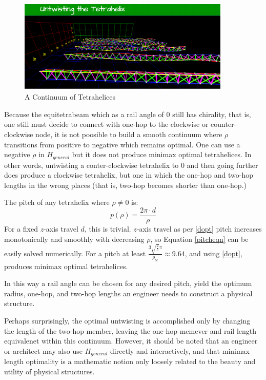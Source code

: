 \documentclass[11pt]{article}
\begin{document}
 \begin{figure}[H]
     \centering
     \includegraphics[width=0.9\textwidth]{figures/Continuum.png}
     \caption{A Continuum of Tetrahelices}
 \end{figure}

 Because the equitetrabeam which as a rail angle of $0$ still has
 chirality, that is, one still must decide to connect with one-hop to
 the clockwise or counter-clockwise node, it is not poosible to build
 a smooth continuum where $\rho$ transitions from positive to negative
 which remains optimal. One can use a negative $\rho$ in $H_{general}$
 but it does not produce minimax optimal tetrahelices. In other words,
 untwisting a conter-clockwise tetrahelix to $0$ and then going
 further does produce a clockwise tetrahelix, but one in which the
 one-hop and two-hop lengths in the wrong places (that is, two-hop
 becomes shorter than one-hop.)
 


The pitch of any tetrahelix 
where $\rho \neq 0$ is:
\begin{equation}
  \label{pitcheqn}
p(\rho) = \frac{2 \pi  \cdot d}{\rho}
\end{equation}
For a fixed $z$-axis travel $d$, this is trivial. 
$z$-axis travel as per \eqref{dopt} pitch increases monotonically and smoothly with decreasing $\rho$, so
Equation \eqref{pitcheqn} can be easily solved numerically.
For a pitch at least $ \frac{3  \sqrt{\frac{2}{5}}  \pi}{\rho_{bc}} \approx 9.64 $,
and using \eqref{dopt}, produces minimax optimal tetrahelices.

In this way a rail angle can be chosen for any desired pitch, yield
the optimum radius, one-hop, and two-hop lengths an engineer needs to
construct a physical structure.

Perhaps surprisingly, the optimal untwisting is accomplished only by
changing the length of the two-hop member, leaving the one-hop memever
and rail length equivalenet within this continuum. However, it should
be noted that an engineer or architect may also use $H_{general}$
directly and interactively, and that minimax length optimality is a
mathematic notion only loosely related to the beauty and utility of
physical structures.
\end{document}
